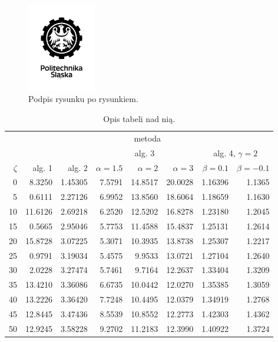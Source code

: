 \documentclass[a4paper,twoside,12pt]{book}
\begin{document}
\begin{figure}
\centering
\includegraphics[width=3cm]{logo_pl.jpg}
\caption{Podpis rysunku po rysunkiem.}
\label{fig:2}
\end{figure}

\begin{table}
\centering
\caption{Opis tabeli nad nią.}
\label{id:tab:wyniki}
\begin{tabular}{rrrrrrrr}
\toprule
	         &                                     \multicolumn{7}{c}{metoda}                                      \\
	         \cmidrule{2-8}
	         &         &         &        \multicolumn{3}{c}{alg. 3}        & \multicolumn{2}{c}{alg. 4, $\gamma = 2$} \\
	         \cmidrule(r){4-6}\cmidrule(r){7-8}
	$\zeta$ &     alg. 1 &   alg. 2 & $\alpha= 1.5$ & $\alpha= 2$ & $\alpha= 3$ &   $\beta = 0.1$  &   $\beta = -0.1$ \\
\midrule
	       0 &  8.3250 & 1.45305 &       7.5791 &    14.8517 &    20.0028 & 1.16396 &                       1.1365 \\
	       5 &  0.6111 & 2.27126 &       6.9952 &    13.8560 &    18.6064 & 1.18659 &                       1.1630 \\
	      10 & 11.6126 & 2.69218 &       6.2520 &    12.5202 &    16.8278 & 1.23180 &                       1.2045 \\
	      15 &  0.5665 & 2.95046 &       5.7753 &    11.4588 &    15.4837 & 1.25131 &                       1.2614 \\
	      20 & 15.8728 & 3.07225 &       5.3071 &    10.3935 &    13.8738 & 1.25307 &                       1.2217 \\
	      25 &  0.9791 & 3.19034 &       5.4575 &     9.9533 &    13.0721 & 1.27104 &                       1.2640 \\
	      30 &  2.0228 & 3.27474 &       5.7461 &     9.7164 &    12.2637 & 1.33404 &                       1.3209 \\
	      35 & 13.4210 & 3.36086 &       6.6735 &    10.0442 &    12.0270 & 1.35385 &                       1.3059 \\
	      40 & 13.2226 & 3.36420 &       7.7248 &    10.4495 &    12.0379 & 1.34919 &                       1.2768 \\
	      45 & 12.8445 & 3.47436 &       8.5539 &    10.8552 &    12.2773 & 1.42303 &                       1.4362 \\
	      50 & 12.9245 & 3.58228 &       9.2702 &    11.2183 &    12.3990 & 1.40922 &                       1.3724 \\
\bottomrule
\end{tabular}
\end{table}  
\end{document}
